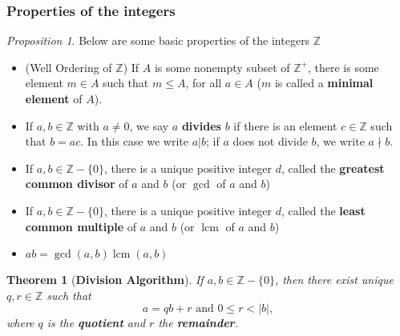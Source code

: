\documentclass[paper=a4, fontsize=11pt]{scrartcl}
\newtheorem{theorem}{Theorem}[section]
\numberwithin{equation}{section}		%
\numberwithin{figure}{section}			%
\numberwithin{table}{section}				%
\newcommand{\lcm}{\ensuremath{\operatorname{lcm}}}
\theoremstyle{definition}
\theoremstyle{remark}
\theoremstyle{example}
\newtheorem{prop}{Proposition}[section]
\begin{document}
\newpage
\subsubsection{Properties of the integers}

\begin{prop}
    Below are some basic properties of the integers $\mathbb{Z}$
    \begin{itemize}
        \item (Well Ordering of $\mathbb{Z}$) If $A$ is some nonempty subset of $\mathbb{Z}^{+}$, there is some element $m \in A$ such that $m \leq A$, for all $a \in A$ ($m$ is called a \textbf{minimal element} of $A$).
        \item If $a,b \in \mathbb{Z}$ with $a \neq 0$, we say $a$ \textbf{divides} $b$ if there is an element $c \in \mathbb{Z}$ such that $b = ac$. In this case we write $a \lvert b$; if $a$ does not divide $b$, we write $a \nmid b$.
        \item If $a,b \in \mathbb{Z}-\{0\}$, there is a unique positive integer $d$, called the \textbf{greatest common divisor} of $a$ and $b$ (or $\gcd$ of $a$ and $b$)
        \item If $a,b \in \mathbb{Z}-\{0\}$, there is a unique positive integer $d$, called the \textbf{least common multiple} of $a$ and $b$ (or $\lcm$ of $a$ and $b$)
        \item $ab = \gcd(a,b)\lcm(a,b)$
    \end{itemize}
\end{prop}

\begin{theorem}[\textbf{Division Algorithm}]
    If $a,b \in \mathbb{Z}-\{0\}$, then there exist unique $q,r \in \mathbb{Z}$ such that
    \begin{equation}
        a = qb +r \text{ and } 0 \leq r < \lvert b \rvert,
    \end{equation}
    where $q$ is the \textbf{quotient} and $r$ the \textbf{remainder}.
\end{theorem}
\end{document}
